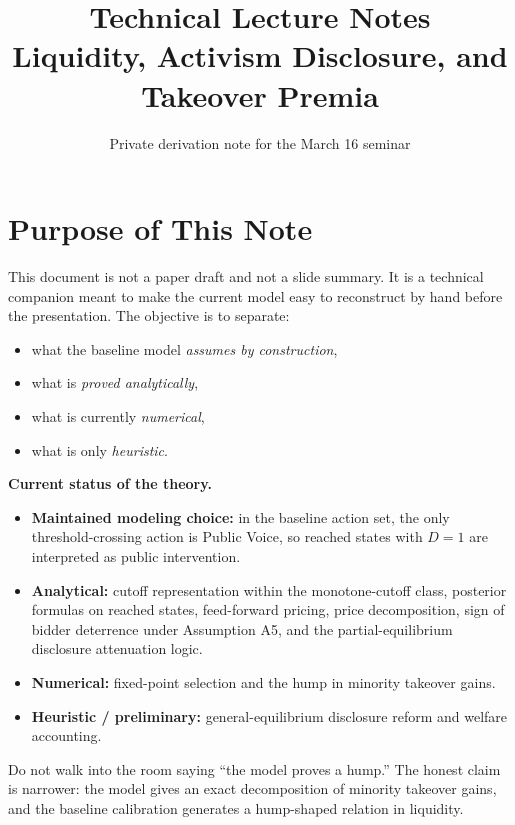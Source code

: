 \documentclass[11pt,a4paper]{article}
\title{\textbf{Technical Lecture Notes}\\Liquidity, Activism Disclosure, and Takeover Premia}
\author{Private derivation note for the March 16 seminar}
\date{}
\theoremstyle{definition}
\theoremstyle{plain}
\theoremstyle{remark}
\newcommand{\1}{\mathbf{1}}
\newcommand{\obs}[1]{{\color{BrickRed}#1}}
\begin{document}
\maketitle
\tableofcontents
\newpage

\section{Purpose of This Note}

This document is not a paper draft and not a slide summary. It is a technical companion meant to make the current model easy to reconstruct by hand before the presentation. The objective is to separate:
\begin{itemize}
\item what the baseline model \emph{assumes by construction},
\item what is \emph{proved analytically},
\item what is currently \emph{numerical},
\item what is only \emph{heuristic}.
\end{itemize}

\begin{statusbox}
\textbf{Current status of the theory.}
\begin{itemize}
\item \textbf{Maintained modeling choice:} in the baseline action set, the only threshold-crossing action is Public Voice, so reached states with \obs{$D=1$} are interpreted as public intervention.
\item \textbf{Analytical:} cutoff representation within the monotone-cutoff class, posterior formulas on reached states, feed-forward pricing, price decomposition, sign of bidder deterrence under Assumption A5, and the partial-equilibrium disclosure attenuation logic.
\item \textbf{Numerical:} fixed-point selection and the hump in minority takeover gains.
\item \textbf{Heuristic / preliminary:} general-equilibrium disclosure reform and welfare accounting.
\end{itemize}
\end{statusbox}

\begin{warningbox}
Do not walk into the room saying ``the model proves a hump.'' The honest claim is narrower: the model gives an exact decomposition of minority takeover gains, and the baseline calibration generates a hump-shaped relation in liquidity.
\end{warningbox}
\end{document}
